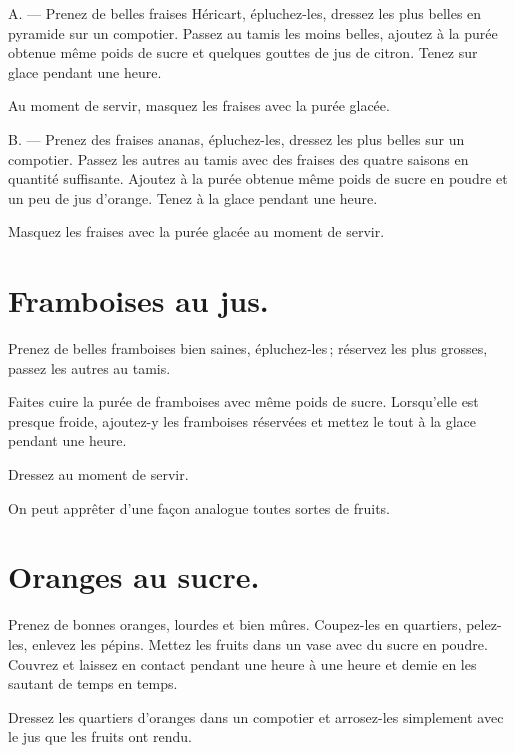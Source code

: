 A. — Prenez de belles fraises Héricart, épluchez-les, dressez les plus belles en
pyramide sur un compotier. Passez au tamis les moins belles, ajoutez à la purée
obtenue même poids de sucre et quelques gouttes de jus de citron. Tenez sur
glace pendant une heure.

Au moment de servir, masquez les fraises avec la purée glacée.

\medskip

B. — Prenez des fraises ananas, épluchez-les, dressez les plus belles sur un
compotier. Passez les autres au tamis avec des fraises des quatre saisons en
quantité suffisante. Ajoutez à la purée obtenue même poids de sucre en poudre
et un peu de jus d'orange. Tenez à la glace pendant une heure.

Masquez les fraises avec la purée glacée au moment de servir.

\section*{\centering Framboises au jus.}
{}

Prenez de belles framboises bien saines, épluchez-les ; réservez les plus grosses,
passez les autres au tamis.

Faites cuire la purée de framboises avec même poids de sucre. Lorsqu'elle est
presque froide, ajoutez-y les framboises réservées et mettez le tout à la glace
pendant une heure.

Dressez au moment de servir.

\sk

On peut apprêter d'une façon analogue toutes sortes de fruits.

\section*{\centering Oranges au sucre.}
{}

Prenez de bonnes oranges, lourdes et bien mûres. Coupez-les en quartiers,
pelez-les, enlevez les pépins. Mettez les fruits dans un vase avec du sucre en
poudre. Couvrez et laissez en contact pendant une heure à une heure et demie
en les sautant de temps en temps.

Dressez les quartiers d'oranges dans un compotier et arrosez-les simplement
avec le jus que les fruits ont rendu.

